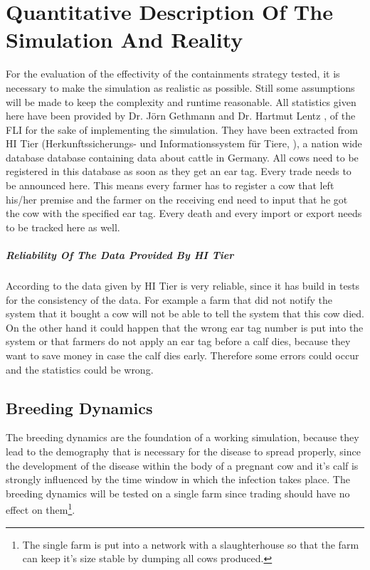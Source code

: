 \chapter{Quantitative Description Of The Simulation And Reality}
For the evaluation of the effectivity of the containments strategy tested, it is necessary to make the simulation as realistic as possible. Still some assumptions will be made to keep the complexity and runtime reasonable. 
All statistics given here have been provided by Dr. Jörn Gethmann and Dr. Hartmut Lentz \citep{personalCom},\citep{personalCom1} of the FLI for the sake of implementing the simulation. They have been extracted from HI Tier (Herkunftssicherungs- und Informationssystem für Tiere, \citep{HIT}), a nation wide database database containing data about cattle in Germany. All cows need to be registered in this database as soon as they get an ear tag. Every trade needs to be announced here. This means every farmer has to register a cow that left his/her premise and the farmer on the receiving end need to input that he got the cow with the specified ear tag. Every death and every import or export needs to be tracked here as well.
\paragraph{Reliability Of The Data Provided By HI Tier}
According to \citep{personalCom} the data given by HI Tier is very reliable, since it has build in tests for the consistency of the data. For example a farm that did not notify the system that it bought a cow will not be able to tell the system that this cow died. On the other hand it could happen that the wrong ear tag number is put into the system or that farmers do not apply an ear tag before a calf dies, because they want to save money in case the calf dies early. Therefore some errors could occur and the statistics could be wrong.
\section{Breeding Dynamics}\label{chap:breedingDynamics}
The breeding dynamics are the foundation of a working simulation, because they lead to the demography that is necessary for the disease to spread properly, since the development of the disease within the body of a pregnant cow and it's calf is strongly influenced by the time window in which the infection takes place.
The breeding dynamics will be tested on a single farm since trading should have no effect on them\footnote{The single farm is put into a network with a slaughterhouse so that the farm can keep it's size stable by dumping all cows produced.}.

